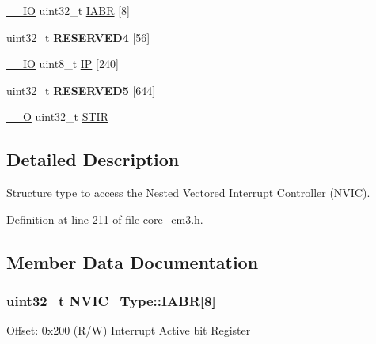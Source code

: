 \begin{DoxyCompactItemize}
\item 
\hyperlink{group___c_m_s_i_s__core__definitions_gaec43007d9998a0a0e01faede4133d6be}{\-\_\-\-\_\-\-I\-O} uint32\-\_\-t \hyperlink{struct_n_v_i_c___type_a33e917b381e08dabe4aa5eb2881a7c11}{\-I\-A\-B\-R} \mbox{[}8\mbox{]}
\item 
\hypertarget{struct_n_v_i_c___type_a5c0e5d507ac3c1bd5cdaaf9bbd177790}{uint32\-\_\-t {\bfseries \-R\-E\-S\-E\-R\-V\-E\-D4} \mbox{[}56\mbox{]}}\label{struct_n_v_i_c___type_a5c0e5d507ac3c1bd5cdaaf9bbd177790}

\item 
\hyperlink{group___c_m_s_i_s__core__definitions_gaec43007d9998a0a0e01faede4133d6be}{\-\_\-\-\_\-\-I\-O} uint8\-\_\-t \hyperlink{struct_n_v_i_c___type_a6524789fedb94623822c3e0a47f3d06c}{\-I\-P} \mbox{[}240\mbox{]}
\item 
\hypertarget{struct_n_v_i_c___type_a4f753b4f824270175af045ac99bc12e8}{uint32\-\_\-t {\bfseries \-R\-E\-S\-E\-R\-V\-E\-D5} \mbox{[}644\mbox{]}}\label{struct_n_v_i_c___type_a4f753b4f824270175af045ac99bc12e8}

\item 
\hyperlink{group___c_m_s_i_s__core__definitions_ga7e25d9380f9ef903923964322e71f2f6}{\-\_\-\-\_\-\-O} uint32\-\_\-t \hyperlink{struct_n_v_i_c___type_a0b0d7f3131da89c659a2580249432749}{\-S\-T\-I\-R}
\end{DoxyCompactItemize}


\subsection{\-Detailed \-Description}
\-Structure type to access the \-Nested \-Vectored \-Interrupt \-Controller (\-N\-V\-I\-C). 

\-Definition at line 211 of file core\-\_\-cm3.\-h.



\subsection{\-Member \-Data \-Documentation}
\hypertarget{struct_n_v_i_c___type_a33e917b381e08dabe4aa5eb2881a7c11}{
\subsubsection[{\-I\-A\-B\-R}]{ uint32\-\_\-t {\bf \-N\-V\-I\-C\-\_\-\-Type\-::\-I\-A\-B\-R}\mbox{[}8\mbox{]}}}\label{struct_n_v_i_c___type_a33e917b381e08dabe4aa5eb2881a7c11}
\-Offset\-: 0x200 (\-R/\-W) \-Interrupt \-Active bit \-Register 

